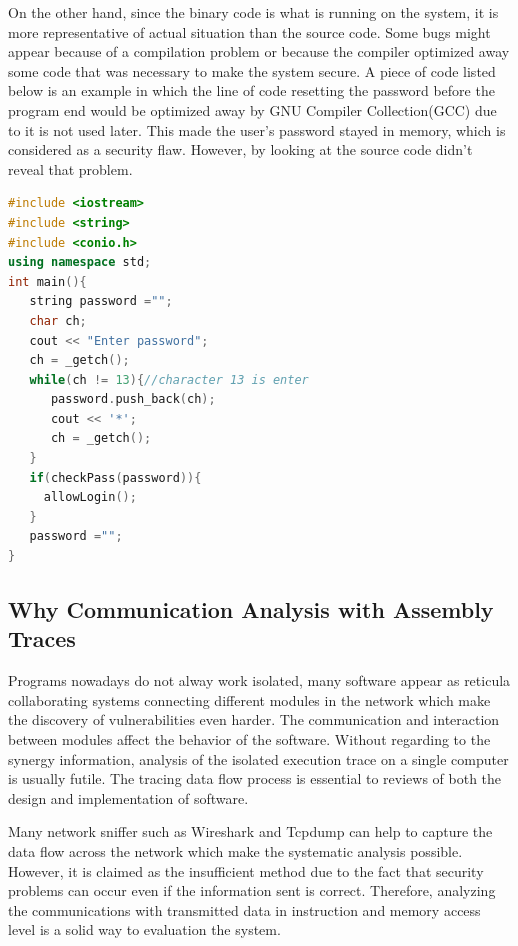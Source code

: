 On the other hand, since the binary code is what is running on the system, it is more representative of actual situation than the source code.  Some bugs might appear because of a compilation problem or because the compiler optimized away some code that was
necessary to make the system secure. A piece of code listed below is an example in which the line of code resetting the password before the program end would be optimized away by GNU Compiler Collection(GCC) due to it is not used later. This made the user's password stayed in memory, which is considered as a security flaw. However, by looking at the source code didn't reveal that problem.

\begin{lstlisting}[language=C++, caption= Password Fetching Example ]
#include <iostream>
#include <string>
#include <conio.h>
using namespace std;
int main(){
   string password ="";
   char ch;
   cout << "Enter password";
   ch = _getch();
   while(ch != 13){//character 13 is enter
      password.push_back(ch);
      cout << '*';
      ch = _getch();
   }   
   if(checkPass(password)){
     allowLogin();
   }  
   password ="";
}
\end{lstlisting}

\subsection{Why Communication Analysis with Assembly Traces}
Programs nowadays do not alway work isolated,  many software  appear as  reticula collaborating systems connecting different modules in the network\cite{PhysRevE.68.046116} which make the discovery of vulnerabilities even harder. The communication and interaction between modules affect the behavior of the software. Without regarding to the synergy information, analysis of the isolated execution trace on a single computer is usually futile. The tracing data flow process is essential to reviews of both the design and implementation of software.

Many network sniffer such as Wireshark\cite{_wireshark_????} and Tcpdump\cite{tcpdump_tcpdump/libpcap_????} can help to capture the data flow across the network which make the systematic analysis possible. However, it is claimed as the insufficient method due to the fact that security problems can occur even if the information sent is correct. Therefore, analyzing the communications with transmitted data in instruction and memory access level is a solid way to evaluation the system.

